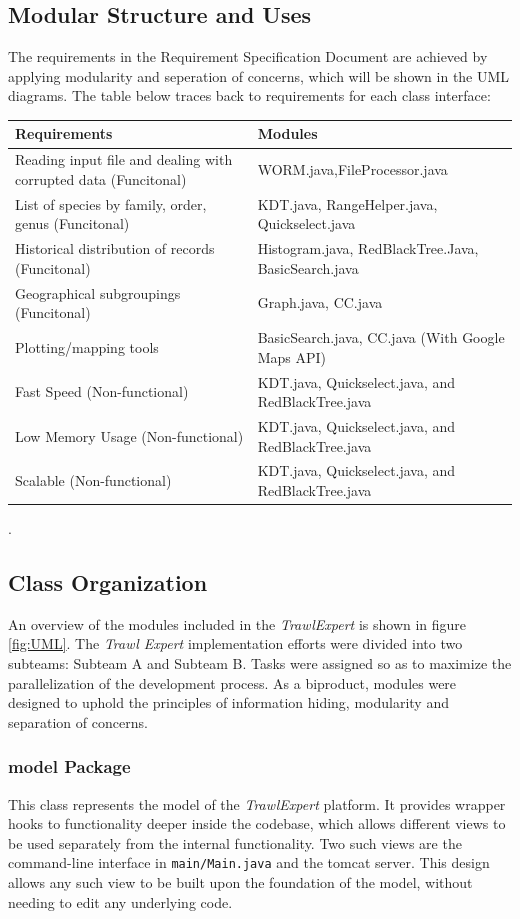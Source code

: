 \documentclass{article}
\begin{document}
\subsection {Modular Structure and Uses}
The requirements in the Requirement Specification Document are achieved by applying modularity and seperation of concerns, which will be shown in the UML diagrams. The table below traces back to requirements for each class interface:\\

\begin{tabular}{| l | l |}
\hline
\textbf{Requirements} & \textbf{Modules}\\
\hline
Reading input file and dealing with corrupted data (Funcitonal)& WORM.java,FileProcessor.java \\
\hline
List of species by family, order, genus  (Funcitonal)& KDT.java, RangeHelper.java, Quickselect.java \\
\hline
Historical distribution of records  (Funcitonal) & Histogram.java, RedBlackTree.Java, BasicSearch.java \\
\hline
Geographical subgroupings  (Funcitonal) & Graph.java, CC.java \\
\hline
Plotting/mapping tools &  BasicSearch.java, CC.java (With Google Maps API) \\
\hline
Fast Speed (Non-functional) & KDT.java, Quickselect.java, and RedBlackTree.java \\
\hline
Low Memory Usage (Non-functional) & KDT.java, Quickselect.java, and RedBlackTree.java \\
\hline
Scalable (Non-functional) & KDT.java, Quickselect.java, and RedBlackTree.java \\
\hline
\end{tabular}.

\subsection{Class Organization}
An overview of the modules included in the \textit{TrawlExpert} is shown in figure \ref{fig:UML}. The \textit{Trawl Expert} implementation efforts were divided into two subteams: Subteam A and Subteam B. Tasks were assigned so as to maximize the parallelization of the development process. As a biproduct, modules were designed to uphold the principles of information hiding, modularity and separation of concerns.

\subsubsection{model Package}
This class represents the model of the \textit{TrawlExpert} platform. It provides wrapper hooks to functionality deeper inside the codebase, which allows different views to be used separately from the internal functionality. Two such views are the command-line interface in \texttt{main/Main.java} and the tomcat server. This design allows any such view to be built upon the foundation of the model, without needing to edit any underlying code.
\end{document}
